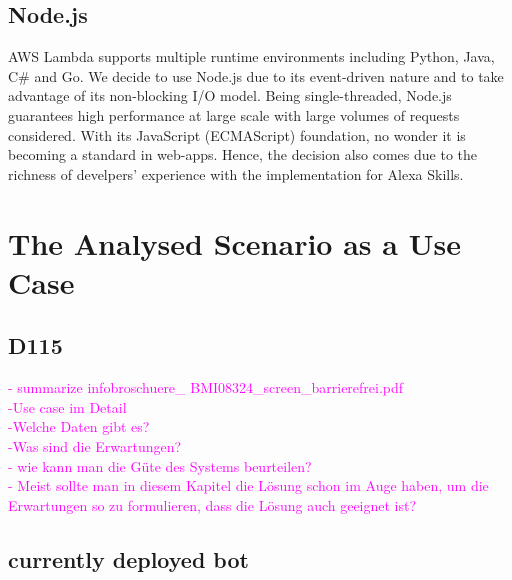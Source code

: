 \subsection*{Node.js}

AWS Lambda supports multiple runtime environments including Python, Java, C\# and Go. We decide to use Node.js due to its event-driven nature and to take advantage of its non-blocking I/O model. Being single-threaded, Node.js guarantees high performance at large scale with large volumes of requests considered. With its JavaScript (ECMAScript) foundation, no wonder it is becoming a standard in web-apps. Hence, the decision also comes due to the richness of develpers' experience with the implementation for Alexa Skills.






\section{The Analysed Scenario as a Use Case}
\subsection*{D115}
\textcolor{magenta}{
	- summarize infobroschuere\_ BMI08324\_screen\_barrierefrei.pdf\\
	-Use case im Detail\\
	-Welche Daten gibt es?\\	  
	-Was sind die Erwartungen?\\ 	
	- wie kann man die G\"ute des Systems beurteilen?\\   
	- Meist sollte man in diesem Kapitel die L\"osung schon im Auge haben, um die Erwartungen so zu formulieren, dass die L\"osung auch geeignet ist?\\ 
}




\subsection{currently deployed bot}



